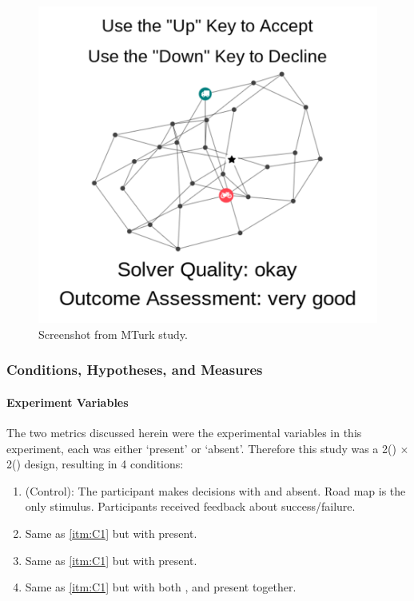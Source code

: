     \begin{figure}[tb]
        \centering
        \includegraphics[width=0.7\linewidth]{Figures/experiment_screenshot_Compressed.png}
        \caption{Screenshot from MTurk study.}
        \label{fig:screenshot}
    \end{figure}

    \subsubsection{Conditions, Hypotheses, and Measures} \label{sec:hyp_cond_meas}
    \paragraph{Experiment Variables}
    The two \famsec{} metrics discussed herein were the experimental variables in this experiment, each was either `present' or `absent'. Therefore this study was a 2(\xQ) $\times$ 2(\xO) design, resulting in 4 conditions:

    \begin{enumerate}[label=\textbf{C\arabic*}]
        \item (Control): The participant makes decisions with \xQ{} and \xO{} absent. Road map is the only stimulus. Participants received feedback about success/failure. \label{itm:C1}
        \item Same as \ref{itm:C1} but with \xQ{} present.\label{itm:C2}
        \item Same as \ref{itm:C1} but with \xO{} present. \label{itm:C3}
        \item Same as \ref{itm:C1} but with both \xQ{}, and \xO{} present together. \label{itm:C4}
    \end{enumerate}

